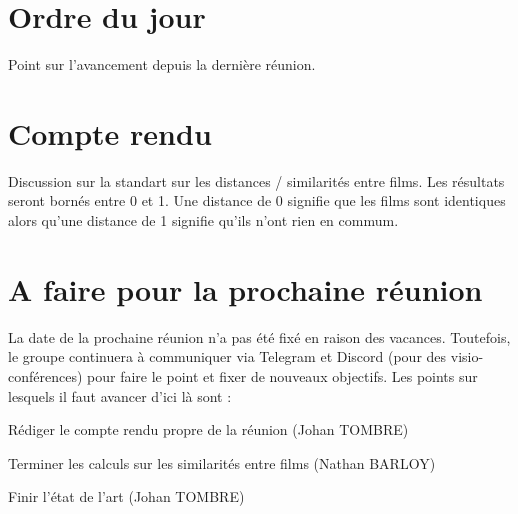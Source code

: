 \documentclass[11pt]{meetingmins}
\begin{document}
\maketitle

\section{Ordre du jour}
Point sur l'avancement depuis la dernière réunion.

\section {Compte rendu}
Discussion sur la standart sur les distances / similarités entre films.
Les résultats seront bornés entre 0 et 1. Une distance de 0 signifie que les films sont identiques alors qu'une distance de 1 signifie qu'ils n'ont rien en commum.

\section{A faire pour la prochaine réunion}
La date de la prochaine réunion n'a pas été fixé en raison des vacances. Toutefois, le groupe continuera à communiquer via Telegram et Discord (pour des visio-conférences) pour faire le point et fixer de nouveaux objectifs.
Les points sur lesquels il faut avancer d'ici là sont :
\begin{items}
	\item Rédiger le compte rendu propre de la réunion (Johan TOMBRE)
	\item Terminer les calculs sur les similarités entre films (Nathan BARLOY)
	\item Finir l'état de l'art (Johan TOMBRE)
\end{items}
\vspace{1cm}
\end{document}
